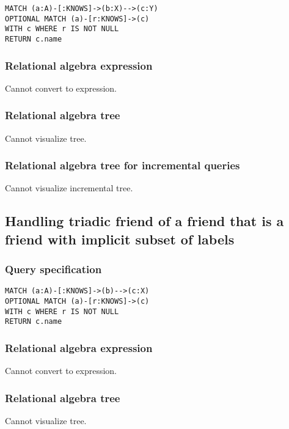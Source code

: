 \begin{lstlisting}
MATCH (a:A)-[:KNOWS]->(b:X)-->(c:Y)
OPTIONAL MATCH (a)-[r:KNOWS]->(c)
WITH c WHERE r IS NOT NULL
RETURN c.name
\end{lstlisting}

\subsubsection*{Relational algebra expression}

Cannot convert to expression.

\subsubsection*{Relational algebra tree}

Cannot visualize tree.

\subsubsection*{Relational algebra tree for incremental queries}

Cannot visualize incremental tree.

\subsection{Handling triadic friend of a friend that is a friend with implicit subset of labels}

\subsubsection*{Query specification}

\begin{lstlisting}
MATCH (a:A)-[:KNOWS]->(b)-->(c:X)
OPTIONAL MATCH (a)-[r:KNOWS]->(c)
WITH c WHERE r IS NOT NULL
RETURN c.name
\end{lstlisting}

\subsubsection*{Relational algebra expression}

Cannot convert to expression.

\subsubsection*{Relational algebra tree}

Cannot visualize tree.

